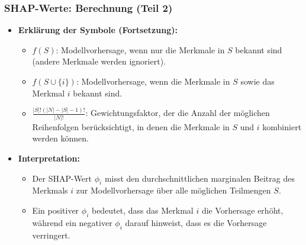 \documentclass[aspectratio=1610, xcolor=dvipsnames, 9pt]{beamer}
\begin{document}
\begin{frame}
  \frametitle{SHAP-Werte: Berechnung (Teil 2)}
  \begin{itemize}
    \item \textbf{Erklärung der Symbole (Fortsetzung):}
    \begin{itemize}
      \item $f(S)$: Modellvorhersage, wenn nur die Merkmale in $S$ bekannt sind (andere Merkmale werden ignoriert).
      \item $f(S \cup \{i\})$: Modellvorhersage, wenn die Merkmale in $S$ sowie das Merkmal $i$ bekannt sind.
      \item $\frac{|S|! (|N| - |S| - 1)!}{|N|!}$: Gewichtungsfaktor, der die Anzahl der möglichen Reihenfolgen berücksichtigt, in denen die Merkmale in $S$ und $i$ kombiniert werden können.
    \end{itemize}
    \item \textbf{Interpretation:}
    \begin{itemize}
      \item Der SHAP-Wert $\phi_i$ misst den durchschnittlichen marginalen Beitrag des Merkmals $i$ zur Modellvorhersage über alle möglichen Teilmengen $S$.
      \item Ein positiver $\phi_i$ bedeutet, dass das Merkmal $i$ die Vorhersage erhöht, während ein negativer $\phi_i$ darauf hinweist, dass es die Vorhersage verringert.
    \end{itemize}
  \end{itemize}
\end{frame}
\end{document}
